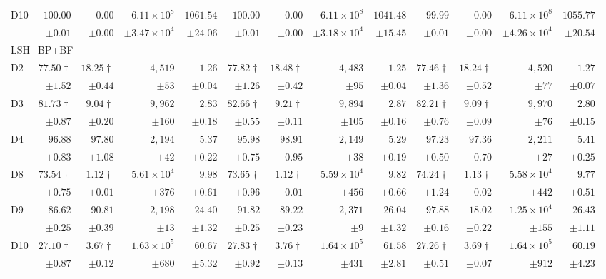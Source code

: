 \begin{table}[t]
{\begin{tabular}{lrrrrrrrrrrrr}
D10 & $100.00$ & $0.00$ & $6.11\times 10^{8}$ & $1061.54$ & $100.00$ & $0.00$ & $6.11\times 10^{8}$ & $1041.48$ & $99.99$ & $0.00$ & $6.11\times 10^{8}$ & $1055.77$ \\
 & $\pm 0.01$ & $\pm 0.00$ & $\pm 3.47\times 10^{4}$ & $\pm 24.06$ & $\pm 0.01$ & $\pm 0.00$ & $\pm 3.18\times 10^{4}$ & $\pm 15.45$ & $\pm 0.01$ & $\pm 0.00$ & $\pm 4.26\times 10^{4}$ & $\pm 20.54$ \\
\midrule
\multicolumn{13}{l}{\textsc{LSH+BP+BF}} \\
\midrule
D2 & $77.50\dagger$ & $18.25\dagger$ & $4{,}519$ & $1.26$ & $77.82\dagger$ & $18.48\dagger$ & $4{,}483$ & $1.25$ & $77.46\dagger$ & $18.24\dagger$ & $4{,}520$ & $1.27$ \\
 & $\pm 1.52$ & $\pm 0.44$ & $\pm 53$ & $\pm 0.04$ & $\pm 1.26$ & $\pm 0.42$ & $\pm 95$ & $\pm 0.04$ & $\pm 1.36$ & $\pm 0.52$ & $\pm 77$ & $\pm 0.07$ \\
D3 & $81.73\dagger$ & $9.04\dagger$ & $9{,}962$ & $2.83$ & $82.66\dagger$ & $9.21\dagger$ & $9{,}894$ & $2.87$ & $82.21\dagger$ & $9.09\dagger$ & $9{,}970$ & $2.80$ \\
 & $\pm 0.87$ & $\pm 0.20$ & $\pm 160$ & $\pm 0.18$ & $\pm 0.55$ & $\pm 0.11$ & $\pm 105$ & $\pm 0.16$ & $\pm 0.76$ & $\pm 0.09$ & $\pm 76$ & $\pm 0.15$ \\
D4 & $96.88$ & $97.80$ & $2{,}194$ & $5.37$ & $95.98$ & $98.91$ & $2{,}149$ & $5.29$ & $97.23$ & $97.36$ & $2{,}211$ & $5.41$ \\
 & $\pm 0.83$ & $\pm 1.08$ & $\pm 42$ & $\pm 0.22$ & $\pm 0.75$ & $\pm 0.95$ & $\pm 38$ & $\pm 0.19$ & $\pm 0.50$ & $\pm 0.70$ & $\pm 27$ & $\pm 0.25$ \\
D8 & $73.54\dagger$ & $1.12\dagger$ & $5.61\times 10^{4}$ & $9.98$ & $73.65\dagger$ & $1.12\dagger$ & $5.59\times 10^{4}$ & $9.82$ & $74.24\dagger$ & $1.13\dagger$ & $5.58\times 10^{4}$ & $9.77$ \\
 & $\pm 0.75$ & $\pm 0.01$ & $\pm 376$ & $\pm 0.61$ & $\pm 0.96$ & $\pm 0.01$ & $\pm 456$ & $\pm 0.66$ & $\pm 1.24$ & $\pm 0.02$ & $\pm 442$ & $\pm 0.51$ \\
D9 & $86.62$ & $90.81$ & $2{,}198$ & $24.40$ & $91.82$ & $89.22$ & $2{,}371$ & $26.04$ & $97.88$ & $18.02$ & $1.25\times 10^{4}$ & $26.43$ \\
 & $\pm 0.25$ & $\pm 0.39$ & $\pm 13$ & $\pm 1.32$ & $\pm 0.25$ & $\pm 0.23$ & $\pm 9$ & $\pm 1.32$ & $\pm 0.16$ & $\pm 0.22$ & $\pm 155$ & $\pm 1.11$ \\
D10 & $27.10\dagger$ & $3.67\dagger$ & $1.63\times 10^{5}$ & $60.67$ & $27.83\dagger$ & $3.76\dagger$ & $1.64\times 10^{5}$ & $61.58$ & $27.26\dagger$ & $3.69\dagger$ & $1.64\times 10^{5}$ & $60.19$ \\
 & $\pm 0.87$ & $\pm 0.12$ & $\pm 680$ & $\pm 5.32$ & $\pm 0.92$ & $\pm 0.13$ & $\pm 431$ & $\pm 2.81$ & $\pm 0.51$ & $\pm 0.07$ & $\pm 912$ & $\pm 4.23$ \\

\hline
\end{tabular}
}
\end{table}
